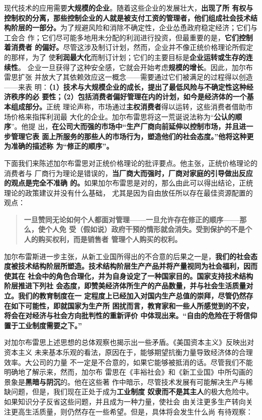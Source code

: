 现代技术的应用需要\textbf{大规模的企业}。随着这些企业的发展壮大，\textbf{出现了所
  有权与控制权的分离，那些控制企业的人就是被支付工资的管理者，他们组成社会技术结
  构阶层的一部分。}为了规避风险和消除不确定性，企业怂恿政府稳定经济；它们与工会合
作；它们尽可能多地用未分配的利润进行投资，但最重要的是，\textbf{它们控制着消费者
  的偏好。}尽管这涉及制订计划，然而，企业并不像正统价格理论所假定的那样，为了
使\textbf{利润最大化}而制订计划；它们的主要目标是\textbf{企业运转或生存的连续性}。
企业一旦获得了这种安全感，它就会开始考虑\textbf{规模的增长}。因此，加尔布雷思扩张
并放大了其依赖效应这一概念——需要通过它们被满足的过程得以创造——来表
明：\textbf{（1）技术与大规模企业的成长，提出了最低风险与不确定性这种经济秩序的必
  要性；（2）包括消费者偏好管理在内的计划，如今是经济体的一个基本组成部分。}正统
理论声称，市场通过\textbf{主权消费者}得以运转，这些消费者借助市场价格来指挥利润最
大化的企业。加尔布雷思将这一荒诞说法称为“\textbf{公认的顺序}”。他提
出，\textbf{在公司大而强的市场中“生产厂商向前延伸以控制市场，并且进一步管理它表
  面上所服务的那些人的市场行为，塑造他们的社会态度。”他将这种更为准确的描述称
  为“修正的顺序”。}

下面我们来陈述加尔布雷思对正统价格理论的批评要点。他主张，正统价格理论的消费者与
厂商行为理论是错误的，\textbf{当厂商大而强时，厂商对家庭的引导做出反应的观点是完全不准确
的。}如果加尔布雷思是对的，那么由此可以得出结论，正统理论的政策建议并没有什么基础，
尤其是因为自由放任所以存在最佳资源配置的观点：
\begin{quotation}
  \textbf{一旦赞同无论如何个人都面对管理——一旦允许存在修正的顺序——那么，使个人免
    受（假如说）政府干预的情形就会消失。受到保护的不是个人的购买权利，而是销售者
    管理个人购买的权利。}
\end{quotation}

加尔布雷斯进一步主张，从新工业国所得出的不合意的后果之一是，\textbf{我们的社会态
  度被技术结构阶层所塑造。技术结构阶层生产产品并将产量视同为社会福利，因而使其在
  社会中的角色合理化，并为自身设定了一种国家目的。国家支持技术结构阶层推进下列社
  会态度，即赞美经济体所生产的产品数量，并与社会生活质量对立。我们的教育制度在一
  定程度上已经加入对国内生产总值的崇拜，尽管仍然存在如下可能性，即就国家为生产所
  困扰而言，教育家和一些人所感觉到的不安，将会在对经济与社会方向批判性的重新评价
  中体现出来。“自由的危险在于将信仰置于工业制度需要之下。”}

对加尔布雷思上述思想的总体观察也揭示出一些矛盾。《美国资本主义》反映出对资本主义
未来基本乐观的看法，原因在于，能够期望抗衡力量导致经济体的合理效率。大公司的力量
不一定是不合意的，如果它能够被抵消的话。尽管我们不能明确地了解示来，然而，加尔布
雷思在《丰裕社会》和《新工业国》中所勾画的景象是\textbf{黑暗与阴沉}的。他在这些著
作中暗示，尽管技术发展有可能解决生产与稀缺问题，但是，我们现在正处于成为\textbf{工业制度
奴隶而不是其主人}的极大危险中。如果知识分子反省这些问题，并且成为一种力量，使社会
由关注更多生产转向关注更高生活质量，则仍然存在一些希望。但是，具体将会发生什么尚
有待观察：

